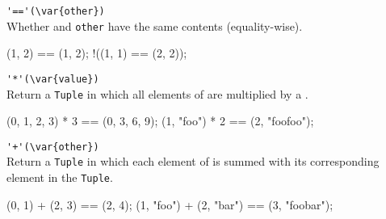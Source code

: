 \begin{urbiscriptapi}
\item \lstinline|'=='(\var{other})|\\
  Whether \this and \lstinline|other| have the same
  contents (equality-wise).
\begin{urbiassert}
  (1, 2) == (1, 2);
!((1, 1) == (2, 2));
\end{urbiassert}

\item \lstinline|'*'(\var{value})|\\
  Return a \lstinline|Tuple| in which all elements of \this are multiplied
  by a .

\begin{urbiassert}
(0, 1, 2, 3) * 3 == (0, 3, 6, 9);
(1, "foo") * 2 == (2, "foofoo");
\end{urbiassert}

\item \lstinline|'+'(\var{other})|\\
  Return a \lstinline|Tuple| in which each element of \this is summed with
  its corresponding element in the  \lstinline|Tuple|.

\begin{urbiassert}
(0, 1) + (2, 3) == (2, 4);
(1, "foo") + (2, "bar") == (3, "foobar");
\end{urbiassert}


\end{urbiscriptapi}



